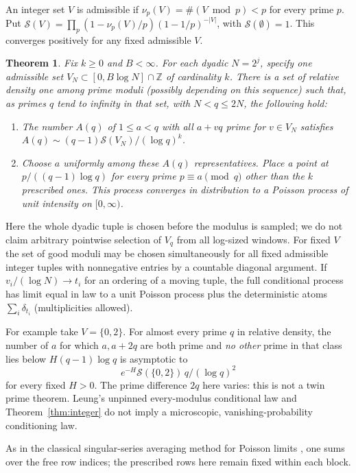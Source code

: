 \documentclass[11pt]{article}
\newtheorem{theorem}{Theorem}
\newcommand{\1}{\mathbf{1}}
\newcommand{\Sg}{\mathcal S}
\begin{document}
An integer set $V$ is admissible if $\nu_p(V)=\#(V\bmod p)<p$ for every prime $p$. Put
$\Sg(V)=\prod_p(1-\nu_p(V)/p)(1-1/p)^{-|V|}$, with $\Sg(\emptyset)=1$. This converges positively for any fixed admissible $V$.
\begin{theorem}\label{thm:prime}
Fix $k\ge0$ and $B<\infty$. For each dyadic $N=2^j$, specify one admissible set $V_N\subset[0,B\log N]\cap\mathbb Z$ of cardinality $k$. There is a set of relative density one among prime moduli (possibly depending on this sequence) such that, as primes $q$ tend to infinity in that set, with $N<q\le2N$, the following hold:
\begin{enumerate}
\item The number $A(q)$ of $1\le a<q$ with all $a+vq$ prime for $v\in V_N$ satisfies
$A(q)\sim(q-1)\Sg(V_N)/(\log q)^k$.
\item Choose $a$ uniformly among these $A(q)$ representatives. Place a point at $p/((q-1)\log q)$ for every prime $p\equiv a\pmod q$ \emph{other than} the $k$ prescribed ones. This process converges in distribution to a Poisson process of unit intensity on $[0,\infty)$.
\end{enumerate}
\end{theorem}
Here the whole dyadic tuple is chosen before the modulus is sampled; we do not claim arbitrary pointwise selection of $V_q$ from all log-sized windows. For fixed $V$ the set of good moduli may be chosen simultaneously for all fixed admissible integer tuples with nonnegative entries by a countable diagonal argument. If $v_i/(\log N)\to t_i$ for an ordering of a moving tuple, the full conditional process has limit equal in law to a unit Poisson process plus the deterministic atoms $\sum_i\delta_{t_i}$ (multiplicities allowed).
\par For example take $V=\{0,2\}$. For almost every prime $q$ in relative density, the number of $a$ for which $a,a+2q$ are both prime and \emph{no other} prime in that class lies below $H(q-1)\log q$ is asymptotic to
\[
 e^{-H}\Sg(\{0,2\})\,q/(\log q)^2
\]
for every fixed $H>0$. The prime difference $2q$ here varies: this is not a twin prime theorem. Leung's unpinned every-modulus conditional law \cite{lepp} and Theorem~\ref{thm:integer} do not imply a microscopic, vanishing-probability conditioning law.

As in the classical singular-series averaging method for
Poisson limits \cite{gal}, one sums over the free row indices;
the prescribed rows here remain fixed within each block.
\end{document}
